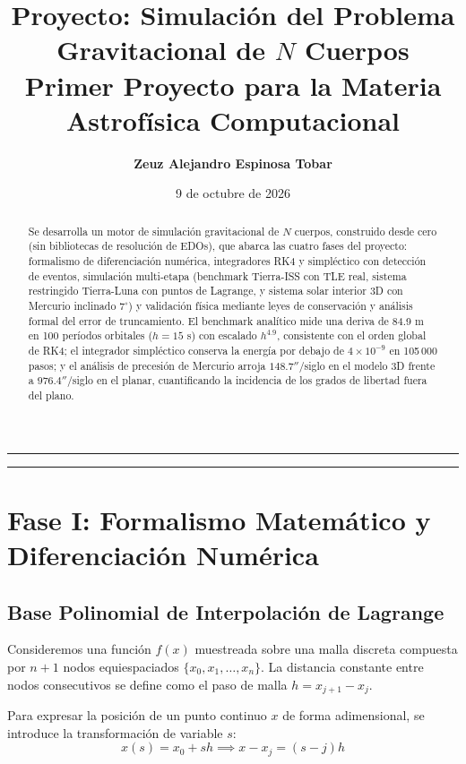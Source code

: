 \documentclass[11pt, a4paper]{article}
\title{\textbf{Proyecto: Simulación del Problema Gravitacional de $N$ Cuerpos}\\
	\large Primer Proyecto para la Materia Astrofísica Computacional}
\author{\textbf{Zeuz Alejandro Espinosa Tobar}}
\date{9 de octubre de 2026}
\begin{document}
\maketitle

\hrule
\vspace{0.4cm}

\begin{abstract}
\noindent
Se desarrolla un motor de simulación gravitacional de $N$ cuerpos, construido desde cero
(sin bibliotecas de resolución de EDOs), que abarca las cuatro fases del proyecto:
formalismo de diferenciación numérica, integradores RK4 y simpléctico con detección de
eventos, simulación multi-etapa (benchmark Tierra-ISS con TLE real, sistema restringido
Tierra-Luna con puntos de Lagrange, y sistema solar interior 3D con Mercurio inclinado
$7^\circ$) y validación física mediante leyes de conservación y análisis formal del error
de truncamiento. El benchmark analítico mide una deriva de 84.9 m en 100 períodos
orbitales ($h = 15$ s) con escalado $h^{4.9}$, consistente con el orden global de RK4; el
integrador simpléctico conserva la energía por debajo de $4\times10^{-9}$ en 105\,000
pasos; y el análisis de precesión de Mercurio arroja $148.7''$/siglo en el modelo 3D
frente a $976.4''$/siglo en el planar, cuantificando la incidencia de los grados de
libertad fuera del plano.
\end{abstract}

\hrule

\section{Fase I: Formalismo Matemático y Diferenciación Numérica}

\subsection{Base Polinomial de Interpolación de Lagrange}

Consideremos una función $f(x)$ muestreada sobre una malla discreta compuesta por $n+1$ nodos equiespaciados $\{x_0, x_1, \dots, x_n\}$. La distancia constante entre nodos consecutivos se define como el paso de malla $h = x_{j+1} - x_j$.

Para expresar la posición de un punto continuo $x$ de forma adimensional, se introduce la transformación de variable $s$:
\begin{equation}
	x(s) = x_0 + s h \implies x - x_j = (s - j) h
	\label{eq:notacion}
\end{equation}
\end{document}
